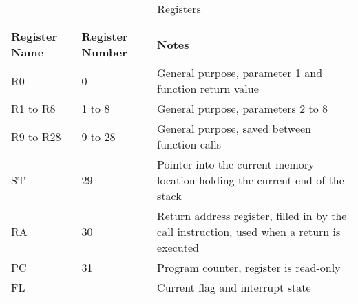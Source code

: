 \begin{table}[H]
\centering
\caption{Registers}
{
\tabulinesep=1mm
\begin{tabu} to \linewidth { X[-2c]  X[-2c]  X }
Register Name & Register Number & Notes \\
\hline
R0 & 0 & General purpose, parameter 1 and function return value \\
R1 to R8 & 1 to 8 & General purpose, parameters 2 to 8 \\
R9 to R28 & 9 to 28 & General purpose, saved between function calls \\
ST & 29 & Pointer into the current memory location holding the current end of the stack \\
RA & 30 & Return address register, filled in by the call instruction, used when a return is executed \\
PC & 31 & Program counter, register is read-only \\
FL &  & Current flag and interrupt state \\
\end{tabu}
}
\end{table}
